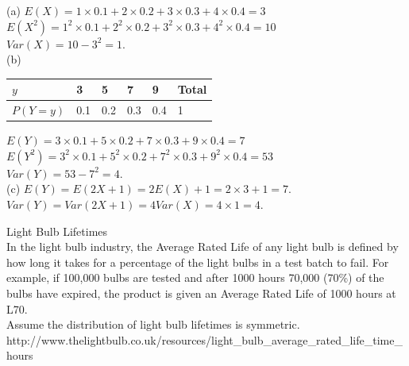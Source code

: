 \documentclass[bigtut]{tutorial}\usepackage[]{graphicx}\usepackage[]{color}
\begin{document}
\begin{tutorial}
\begin{questions}

\begin{solution}
(a)
$E(X) = 1 \times 0.1 + 2 \times 0.2 + 3 \times 0.3 + 4 \times 0.4 = 3$ \\
$E(X^2) = 1^2 \times 0.1 + 2^2 \times 0.2 + 3^2 \times 0.3 + 4^2 \times 0.4 = 10$ \\
$Var(X) = 10-3^2 = 1$. \\

(b) \\
\begin{tabular}{| l | l | l | l | l | l |} \hline
$y$ & 3 & 5 & 7 & 9 & Total \\ \hline
$P(Y=y)$ & 0.1 & 0.2  & 0.3 & 0.4 & 1 \\ \hline
\end{tabular}

\vspace{.5cm}
$E(Y) = 3 \times 0.1 + 5 \times 0.2 + 7 \times 0.3 + 9 \times 0.4 = 7$ \\
$E(Y^2) = 3^2 \times 0.1 + 5^2 \times 0.2 + 7^2 \times 0.3 + 9^2 \times 0.4 = 53$ \\
$Var(Y) = 53-7^2 = 4$. \\

(c)
$E(Y) = E(2X+1) = 2E(X)+1 = 2 \times 3 + 1 = 7$. \\
$Var(Y) = Var(2X+1) = 4Var(X) = 4 \times 1 = 4$.
\end{solution}


\question Light Bulb Lifetimes \\

In the light bulb industry, the Average Rated Life of any light bulb is defined by how long it takes for a percentage of the light bulbs in a test batch to fail. For example, if 100,000 bulbs are tested and after 1000 hours 70,000 (70\%) of the bulbs have expired, the product is given an Average Rated Life of 1000 hours at L70.  \\
Assume the distribution of light bulb lifetimes is symmetric. \\
{\tiny http://www.thelightbulb.co.uk/resources/light\_bulb\_average\_rated\_life\_time\_hours} \\


\end{questions}
\end{tutorial}
\end{document}
